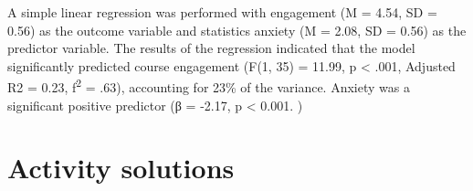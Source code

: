 \documentclass[]{book}
\newenvironment{Shaded}{\begin{snugshade}}{\end{snugshade}}
\newcommand{\ControlFlowTok}[1]{\textcolor[rgb]{0.13,0.29,0.53}{\textbf{#1}}}
\newcommand{\DataTypeTok}[1]{\textcolor[rgb]{0.13,0.29,0.53}{#1}}
\newcommand{\DecValTok}[1]{\textcolor[rgb]{0.00,0.00,0.81}{#1}}
\newcommand{\ErrorTok}[1]{\textcolor[rgb]{0.64,0.00,0.00}{\textbf{#1}}}
\newcommand{\FloatTok}[1]{\textcolor[rgb]{0.00,0.00,0.81}{#1}}
\newcommand{\KeywordTok}[1]{\textcolor[rgb]{0.13,0.29,0.53}{\textbf{#1}}}
\newcommand{\NormalTok}[1]{#1}
\newcommand{\OperatorTok}[1]{\textcolor[rgb]{0.81,0.36,0.00}{\textbf{#1}}}
\newcommand{\StringTok}[1]{\textcolor[rgb]{0.31,0.60,0.02}{#1}}
\begin{document}
\begin{Shaded}
\end{Shaded}

A simple linear regression was performed with engagement (M = 4.54, SD = 0.56) as the outcome variable and statistics anxiety (M = 2.08, SD = 0.56) as the predictor variable. The results of the regression indicated that the model significantly predicted course engagement (F(1, 35) = 11.99, p \textless{} .001, Adjusted R2 = 0.23, f\textsuperscript{2} = .63), accounting for 23\% of the variance. Anxiety was a significant positive predictor (β = -2.17, p \textless{} 0.001.
)

\hypertarget{activity-solutions-9}{%
\section{Activity solutions}\label{activity-solutions-9}}
\end{document}
